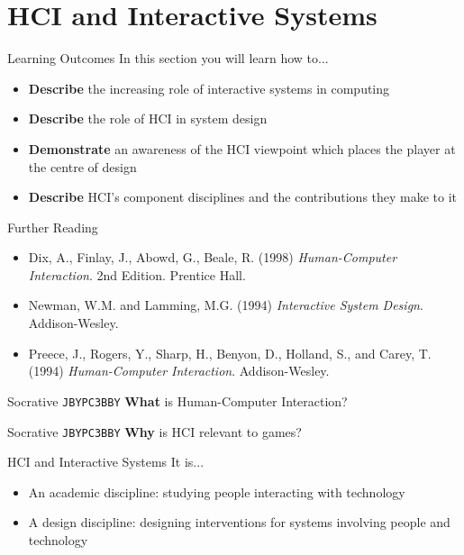 \part{HCI and Interactive Systems}
\frame{\partpage}

\begin{frame}{Learning Outcomes}
	In this section you will learn how to...
	
	\begin{itemize}
		\item \textbf{Describe} the increasing role of interactive systems in computing
		\item \textbf{Describe} the role of HCI in system design
		\item \textbf{Demonstrate} an awareness of the HCI viewpoint which places the player at the centre of design
		\item \textbf{Describe} HCI's component disciplines and the contributions they make to it
	\end{itemize}
\end{frame}

\begin{frame}{Further Reading}
	\begin{itemize}
		\item Dix, A., Finlay, J., Abowd, G., Beale, R. (1998) \textit{Human-Computer Interaction}. 2nd Edition. Prentice Hall.
		\item Newman, W.M. and Lamming, M.G. (1994) \textit{Interactive System Design}. Addison-Wesley.
		\item Preece, J., Rogers, Y., Sharp, H., Benyon, D., Holland, S., and Carey, T. (1994) \textit{Human-Computer Interaction}. Addison-Wesley.
	\end{itemize}
\end{frame}

\begin{frame}[fragile]{Socrative \texttt{JBYPC3BBY}}
    \textbf{What} is Human-Computer Interaction?
\end{frame}

\begin{frame}[fragile]{Socrative \texttt{JBYPC3BBY}}
    \textbf{Why} is HCI relevant to games?
\end{frame}

\begin{frame}{HCI and Interactive Systems}
	It is...
	\begin{itemize}
		\item An academic discipline: studying people interacting with technology
		\item A design discipline: designing interventions for systems involving people and technology
	\end{itemize}
\end{frame}

